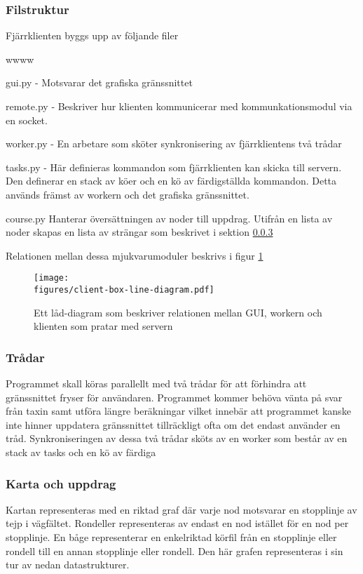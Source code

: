 \documentclass[tekniskrapport/tech.tex]{subfiles}
\begin{document}
\subsubsection{Filstruktur}
Fjärrklienten byggs upp av följande filer

\begin{labeling}{wwww}
	\item[gui.py] - Motsvarar det grafiska gränssnittet
	
	\item[remote.py] - Beskriver hur klienten kommunicerar med
		kommunkationsmodul via en socket.

	\item[worker.py] - En arbetare som sköter synkronisering av
		fjärrklientens två trådar
	
	\item[tasks.py] - Här definieras kommandon som fjärrklienten kan skicka
		till servern. Den definerar en stack av köer och en kö av
		färdigställda kommandon.  Detta används främst av workern och
		det grafiska gränssnittet.
    
    \item[course.py] Hanterar översättningen av noder till uppdrag. Utifrån en
    lista av noder skapas en lista av strängar som beskrivet i sektion
    \ref{mission}

\end{labeling}
Relationen mellan dessa mjukvarumoduler beskrivs i figur \ref{boxclient}

\begin{figure}[h]
\centering
	\texttt{[image: \\figures/client-box-line-diagram.pdf]}
	\caption{Ett låd-diagram som beskriver relationen mellan GUI,
	workern och klienten som pratar med servern}
	\label{boxclient}
\end{figure} 

\subsubsection{Trådar}
Programmet skall köras parallellt med två trådar för att förhindra att
gränssnittet fryser för användaren. Programmet kommer behöva vänta på svar från
taxin samt utföra längre beräkningar vilket innebär att programmet kanske inte
hinner uppdatera gränssnittet tillräckligt ofta om det endast använder en tråd.
Synkroniseringen av dessa två trådar sköts av en worker som består av
en stack av tasks och en kö av färdiga 

\subsubsection{Karta och uppdrag}
\label{mission}
Kartan representeras med en riktad graf där varje nod motsvarar en stopplinje
av tejp i vägfältet. Rondeller representeras av endast en nod istället för en
nod per stopplinje. En båge representerar en enkelriktad körfil från en
stopplinje eller rondell till en annan stopplinje eller rondell. Den här grafen
representeras i sin tur av nedan datastrukturer.
\end{document}
